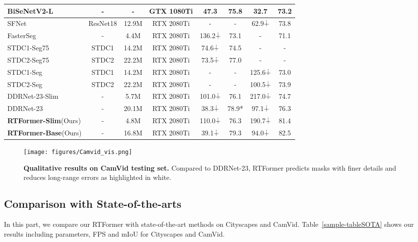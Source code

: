 \documentclass{article}
\begin{document}
\begin{table}
{\begin{tabular}{l|c|c|c|cc|cc}
    BiSeNetV2-L \cite{yu2021bisenet} &-  &-  &GTX 1080Ti &47.3     &75.8  &32.7 &73.2 \\
\midrule
    SFNet   \cite{li2020semantic}
&ResNet18  &12.9M &RTX 2080Ti &- &-  &62.9$\dotplus$ &73.8\\
    \midrule
    FasterSeg \cite{chen2019fasterseg} &- &4.4M &RTX 2080Ti &136.2$\dotplus$ &73.1 &- &71.1\\
    \midrule
    STDC1-Seg75\cite{fan2021rethinking} &STDC1 &14.2M &RTX 2080Ti &74.6$\dotplus$ &74.5 &- &-\\
    STDC2-Seg75\cite{fan2021rethinking} &STDC2 &22.2M &RTX 2080Ti &73.5$\dotplus$ &77.0 &- &-\\
    STDC1-Seg\cite{fan2021rethinking} &STDC1 &14.2M &RTX 2080Ti &- &- &125.6$\dotplus$ &73.0\\
    STDC2-Seg\cite{fan2021rethinking} &STDC2 &22.2M &RTX 2080Ti &- &- &100.5$\dotplus$ &73.9\\
    \midrule
    DDRNet-23-Slim \cite{hong2021deep} &- &5.7M &RTX 2080Ti &101.0$\dotplus$ &76.1 &217.0$\dotplus$ &74.7\\
    DDRNet-23 \cite{hong2021deep} &- &20.1M &RTX 2080Ti &38.3$\dotplus$ &78.9* &97.1$\dotplus$ &76.3\\
    \midrule
    \textbf{RTFormer-Slim}(Ours) &- &4.8M &RTX 2080Ti &110.0$\dotplus$ &76.3 &190.7$\dotplus$ &81.4\\
    \textbf{RTFormer-Base}(Ours) &- &16.8M &RTX 2080Ti &39.1$\dotplus$ &79.3 &94.0$\dotplus$ &82.5\\
\bottomrule
  \end{tabular}
}
\end{table}


\begin{figure}
    \centering
    \texttt{[image: figures/Camvid\_vis.png]}
    \caption{\textbf{Qualitative results on CamVid\cite{CamVid} testing set.} Compared to DDRNet-23\cite{fu2019dual}, RTFormer predicts masks with finer details and reduces long-range errors as highlighted in white.}
    \label{fig:vis_camvid}
\end{figure}


\subsection{Comparison with State-of-the-arts}
In this part, we compare our RTFormer with state-of-the-art methods on Cityscapes\cite{Cityscapes} and CamVid\cite{CamVid}. Table~\ref{sample-tableSOTA} shows our results including parameters, FPS and mIoU for Cityscapes\cite{Cityscapes} and CamVid\cite{CamVid}.
\end{document}

